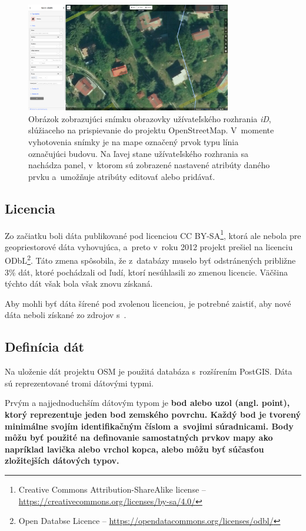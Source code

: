 \begin{figure}[hbt]
	\centering
	\includegraphics[width=0.8\textwidth]{obrazky-figures/osm_id.png}
	\caption{Obrázok zobrazujúci snímku obrazovky užívateľského rozhrania {\it iD}, slúžiaceho na prispievanie do projektu OpenStreetMap. V~momente vyhotovenia snímky je na mape označený prvok typu línia označujúci budovu. Na ľavej stane užívateľského rozhrania sa nachádza panel, v~ktorom sú zobrazené nastavené atribúty daného prvku a~umožňuje atribúty editovať alebo pridávať.}
	\label{img_osm_id}
\end{figure}

\subsection*{Licencia}
Zo začiatku boli dáta publikované pod licenciou CC BY-SA\footnote{Creative Commons Attribution-ShareAlike license -- \url{https://creativecommons.org/licenses/by-sa/4.0/}}, ktorá ale nebola pre geopriestorové dáta vyhovujúca, a~preto v~roku 2012 projekt prešiel na licenciu ODbL\footnote{Open Databse Licence -- \url{https://opendatacommons.org/licenses/odbl/}}. Táto zmena spôsobila, že z~databázy muselo byť odstránených približne 3\% dát, ktoré pochádzali od ľudí, ktorí nesúhlasili zo zmenou licencie. Väčšina týchto dát však bola však znovu získaná. 

Aby mohli byť dáta šírené pod zvolenou licenciou, je potrebné zaistiť, aby nové dáta neboli získané zo zdrojov s~.

\subsection*{Definícia dát}
Na uloženie dát projektu OSM je použitá databáza s~rozšírením PostGIS. Dáta sú reprezentované tromi dátovými typmi.

Prvým a najjednoduchším dátovým typom je \bf bod \rm alebo uzol (angl. point), ktorý reprezentuje jeden bod zemského povrchu. Každý bod je tvorený minimálne svojím identifikačným číslom a~svojimi súradnicami. Body môžu byť použité na definovanie samostatných prvkov mapy ako napríklad lavička alebo vrchol kopca, alebo môžu byť súčasťou zložitejších dátových typov.

